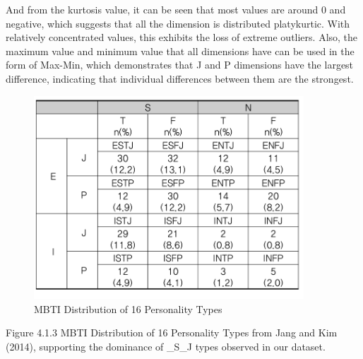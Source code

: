 \documentclass[12pt]{article}
\numberwithin{figure}{section}  %
\begin{document}
	And from the kurtosis value, it can be seen that most values are around 0
	and negative, which suggests that all the dimension is distributed
	platykurtic. With relatively concentrated values, this exhibits the loss of
	extreme outliers. Also, the maximum value and minimum value that all
	dimensions have can be used in the form of Max-Min, which demonstrates that
	J and P dimensions have the largest difference, indicating that individual
	differences between them are the strongest.
	\begin{figure}[H]
		\centering
		\includegraphics[width=0.9\textwidth]{Q1EDA7} 
		\caption{MBTI Distribution of 16 Personality Types}		
	\end{figure}
	
	Figure 4.1.3 MBTI Distribution of 16 Personality Types from Jang and Kim %
	(2014), supporting the dominance of \_S\_J types observed in our dataset. 
	
\end{document}

